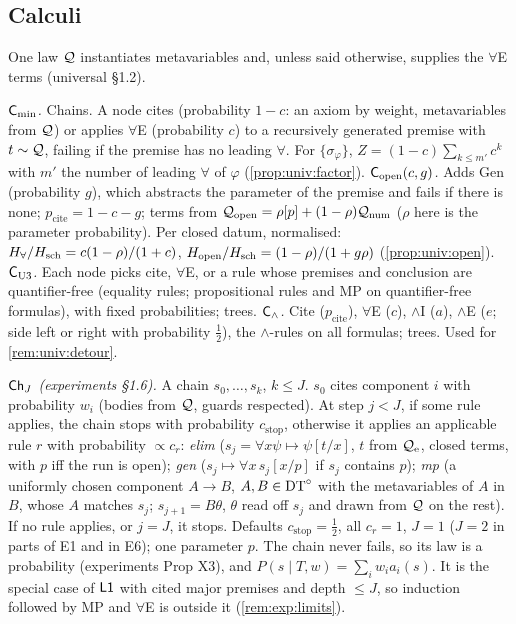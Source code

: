 \subsection{Calculi}\label{app:model:calculi}

One law $\mathcal{Q}$ instantiates metavariables and, unless said otherwise, supplies the $\forall$E terms (universal \S1.2).

\emph{$\mathsf{C}_{\min}$.} Chains. A node cites (probability $1-c$: an axiom by weight, metavariables from $\mathcal{Q}$) or applies $\forall$E (probability $c$) to a recursively generated premise with $t\sim\mathcal{Q}$, failing if the premise has no leading $\forall$. For $\{\sigma_\varphi\}$, $Z=(1-c)\sum_{k\le m'}c^k$ with $m'$ the number of leading $\forall$ of $\varphi$ (\cref{prop:univ:factor}).
\emph{$\mathsf{C}_{\mathrm{open}}(c,g)$.} Adds Gen (probability $g$), which abstracts the parameter of the premise and fails if there is none; $p_{\mathrm{cite}}=1-c-g$; terms from $\mathcal{Q}_{\mathrm{open}}=\rho[p]+(1-\rho)\mathcal{Q}_{\mathrm{num}}$ ($\rho$ here is the parameter probability). Per closed datum, normalised: $H_{\forall}/H_{\mathrm{sch}}=c(1-\rho)/(1+c)$, $H_{\mathrm{open}}/H_{\mathrm{sch}}=(1-\rho)/(1+g\rho)$ (\cref{prop:univ:open}).
\emph{$\mathsf{C}_{\mathrm{U3}}$.} Each node picks cite, $\forall$E, or a rule whose premises and conclusion are quantifier-free (equality rules; propositional rules and MP on quantifier-free formulas), with fixed probabilities; trees.
\emph{$\mathsf{C}_{\wedge}$.} Cite ($p_{\mathrm{cite}}$), $\forall$E ($c$), $\wedge$I ($a$), $\wedge$E ($e$; side left or right with probability $\tfrac12$), the $\wedge$-rules on all formulas; trees. Used for \cref{rem:univ:detour}.

\emph{$\mathsf{Ch}_{J}$ (experiments \S1.6).} A chain $s_0,\dots,s_k$, $k\le J$. $s_0$ cites component $i$ with probability $w_i$ (bodies from $\mathcal{Q}$, guards respected). At step $j<J$, if some rule applies, the chain stops with probability $c_{\mathrm{stop}}$, otherwise it applies an applicable rule $r$ with probability $\propto c_r$: \emph{elim} ($s_j=\forall x\psi\mapsto\psi[t/x]$, $t$ from $\mathcal{Q}_{\mathrm{e}}$, closed terms, with $p$ iff the run is open); \emph{gen} ($s_j\mapsto\forall x\,s_j[x/p]$ if $s_j$ contains $p$); \emph{mp} (a uniformly chosen component $A\to B$, $A,B\in\mathrm{DT}^{\circ}$ with the metavariables of $A$ in $B$, whose $A$ matches $s_j$; $s_{j+1}=B\theta$, $\theta$ read off $s_j$ and drawn from $\mathcal{Q}$ on the rest). If no rule applies, or $j=J$, it stops. Defaults $c_{\mathrm{stop}}=\tfrac12$, all $c_r=1$, $J=1$ ($J=2$ in parts of E1 and in E6); one parameter $p$. The chain never fails, so its law is a probability (experiments Prop X3), and $P(s\mid T,w)=\sum_iw_ia_i(s)$. It is the special case of $\mathord{\mathsf{L1}}$ with cited major premises and depth $\le J$, so induction followed by MP and $\forall$E is outside it (\cref{rem:exp:limits}).

